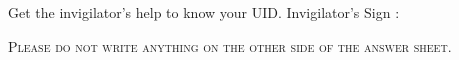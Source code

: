 \AMCcleardoublepage 
\AMCformBegin                                                            

\vspace*{.5cm}

Get the invigilator's help  to know your UID. \hspace*{5mm} Invigilator's   Sign : \dotfill \\[5pt]









\begin{multicols}{2}
\AMCform    
\end{multicols}
\vfill
\begin{center}{\textsc{\LARGE Please do not write anything  on the other side of the answer sheet.}}\\[5pt]  \end{center}



